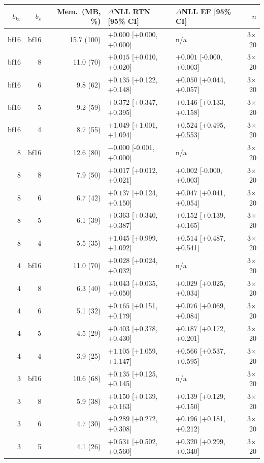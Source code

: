 \begin{tabular}{rrrllr}
\toprule
$b_{kv}$ & $b_s$ & Mem.\ (MB, \%) & $\Delta$NLL RTN [95\% CI] & $\Delta$NLL EF [95\% CI] & $n$ \\
\midrule
bf16 & bf16 & 15.7 (100) & $+0.000$ [+0.000, +0.000] & n/a & 3$\times$20 \\
bf16 & 8 & 11.0 (70) & $+0.015$ [+0.010, +0.020] & $+0.001$ [-0.000, +0.003] & 3$\times$20 \\
bf16 & 6 & 9.8 (62) & $+0.135$ [+0.122, +0.148] & $+0.050$ [+0.044, +0.057] & 3$\times$20 \\
bf16 & 5 & 9.2 (59) & $+0.372$ [+0.347, +0.395] & $+0.146$ [+0.133, +0.158] & 3$\times$20 \\
bf16 & 4 & 8.7 (55) & $+1.049$ [+1.001, +1.094] & $+0.524$ [+0.495, +0.553] & 3$\times$20 \\
8 & bf16 & 12.6 (80) & $-0.000$ [-0.001, +0.000] & n/a & 3$\times$20 \\
8 & 8 & 7.9 (50) & $+0.017$ [+0.012, +0.021] & $+0.002$ [-0.000, +0.003] & 3$\times$20 \\
8 & 6 & 6.7 (42) & $+0.137$ [+0.124, +0.150] & $+0.047$ [+0.041, +0.054] & 3$\times$20 \\
8 & 5 & 6.1 (39) & $+0.363$ [+0.340, +0.387] & $+0.152$ [+0.139, +0.165] & 3$\times$20 \\
8 & 4 & 5.5 (35) & $+1.045$ [+0.999, +1.092] & $+0.514$ [+0.487, +0.541] & 3$\times$20 \\
4 & bf16 & 11.0 (70) & $+0.028$ [+0.024, +0.032] & n/a & 3$\times$20 \\
4 & 8 & 6.3 (40) & $+0.043$ [+0.035, +0.050] & $+0.029$ [+0.025, +0.034] & 3$\times$20 \\
4 & 6 & 5.1 (32) & $+0.165$ [+0.151, +0.179] & $+0.076$ [+0.069, +0.084] & 3$\times$20 \\
4 & 5 & 4.5 (29) & $+0.403$ [+0.378, +0.430] & $+0.187$ [+0.172, +0.201] & 3$\times$20 \\
4 & 4 & 3.9 (25) & $+1.105$ [+1.059, +1.147] & $+0.566$ [+0.537, +0.595] & 3$\times$20 \\
3 & bf16 & 10.6 (68) & $+0.135$ [+0.125, +0.145] & n/a & 3$\times$20 \\
3 & 8 & 5.9 (38) & $+0.150$ [+0.139, +0.163] & $+0.139$ [+0.129, +0.150] & 3$\times$20 \\
3 & 6 & 4.7 (30) & $+0.289$ [+0.272, +0.308] & $+0.196$ [+0.181, +0.212] & 3$\times$20 \\
3 & 5 & 4.1 (26) & $+0.531$ [+0.502, +0.560] & $+0.320$ [+0.299, +0.340] & 3$\times$20 \\

\end{tabular}
